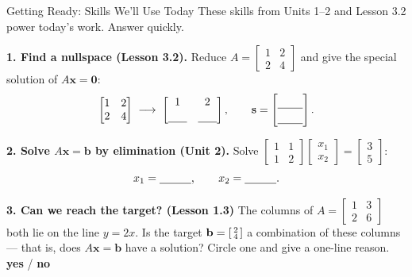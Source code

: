 \documentclass[10pt]{article}
\newcommand{\xx}{\mathbf{x}}
\newcommand{\bb}{\mathbf{b}}
\newcommand{\svec}{\mathbf{s}}
\newcommand{\zero}{\mathbf{0}}
\begin{document}
\namedateperiod

\vspace{0.12in}

\begin{notesbox}{Getting Ready: Skills We'll Use Today}
\small These skills from Units 1--2 and Lesson 3.2 power today's work. Answer quickly.

\vspace{4pt}
\textbf{1. Find a nullspace (Lesson 3.2).} Reduce $A=\begin{bmatrix} 1 & 2 \\ 2 & 4 \end{bmatrix}$ and
give the special solution of $A\xx=\zero$:
\[
  \begin{bmatrix} 1 & 2 \\ 2 & 4 \end{bmatrix}
  \;\longrightarrow\;
  \begin{bmatrix} 1 & 2 \\[2pt] \blank{0.6cm} & \blank{0.6cm} \end{bmatrix},
  \qquad
  \svec=\begin{bmatrix}\rule{0pt}{1.1em}\blank{0.8cm}\\[2pt]\blank{0.8cm}\end{bmatrix}.
\]

\vspace{4pt}
\textbf{2. Solve $A\xx=\bb$ by elimination (Unit 2).} Solve
$\begin{bmatrix} 1 & 1 \\ 1 & 2 \end{bmatrix}\begin{bmatrix} x_1 \\ x_2 \end{bmatrix}=\begin{bmatrix} 3 \\ 5 \end{bmatrix}$:
\[
  x_1=\blank{1.0cm}, \qquad x_2=\blank{1.0cm}.
\]

\vspace{4pt}
\textbf{3. Can we reach the target? (Lesson 1.3)} The columns of $A=\begin{bmatrix} 1 & 3 \\ 2 & 6 \end{bmatrix}$
both lie on the line $y=2x$. Is the target $\bb=\begin{bsmallmatrix} 2\\4 \end{bsmallmatrix}$ a combination
of these columns --- that is, does $A\xx=\bb$ have a solution? Circle one and give a one-line reason.
\quad \textbf{yes} / \textbf{no}
\writeline
\end{notesbox}
\end{document}
